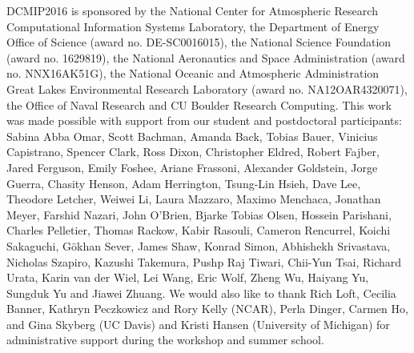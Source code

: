 \documentclass[gmd, manuscript]{copernicus}
\begin{document}
\begin{acknowledgements}
DCMIP2016 is sponsored by the National Center for Atmospheric Research Computational Information Systems Laboratory, the Department of Energy Office of Science (award no. DE-SC0016015), the National Science Foundation (award no. 1629819), the National Aeronautics and Space Administration (award no. NNX16AK51G), the National Oceanic and Atmospheric Administration Great Lakes Environmental Research Laboratory (award no. NA12OAR4320071), the Office of Naval Research and CU Boulder Research Computing.  This work was made possible with support from our student and postdoctoral participants: Sabina Abba Omar, Scott Bachman, Amanda Back, Tobias Bauer, Vinicius Capistrano, Spencer Clark, Ross Dixon, Christopher Eldred, Robert Fajber, Jared Ferguson, Emily Foshee, Ariane Frassoni, Alexander Goldstein, Jorge Guerra, Chasity Henson, Adam Herrington, Tsung-Lin Hsieh, Dave Lee, Theodore Letcher, Weiwei Li, Laura Mazzaro, Maximo Menchaca, Jonathan Meyer, Farshid Nazari, John O'Brien, Bjarke Tobias Olsen, Hossein Parishani, Charles Pelletier, Thomas Rackow, Kabir Rasouli, Cameron Rencurrel, Koichi Sakaguchi, G\"okhan Sever, James Shaw, Konrad Simon, Abhishekh Srivastava, Nicholas Szapiro, Kazushi Takemura, Pushp Raj Tiwari, Chii-Yun Tsai, Richard Urata, Karin van der Wiel, Lei Wang, Eric Wolf, Zheng Wu, Haiyang Yu, Sungduk Yu and Jiawei Zhuang.  We would also like to thank Rich Loft, Cecilia Banner, Kathryn Peczkowicz and Rory Kelly (NCAR), Perla Dinger, Carmen Ho, and Gina Skyberg (UC Davis) and Kristi Hansen (University of Michigan) for administrative support during the workshop and summer school.  
\end{acknowledgements}








\end{document}
